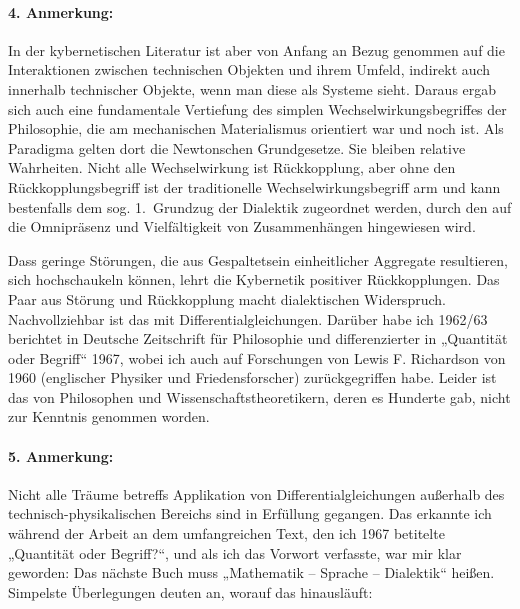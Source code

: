 \documentclass[11pt,a4paper]{article}
\begin{document}
\paragraph{4. Anmerkung:}
In der kybernetischen Literatur ist aber von Anfang an Bezug genommen auf die
Interaktionen zwischen technischen Objekten und ihrem Umfeld, indirekt auch
innerhalb technischer Objekte, wenn man diese als Systeme sieht. Daraus ergab
sich auch eine fundamentale Vertiefung des simplen Wechselwirkungsbegriffes
der Philosophie, die am mechanischen Materialismus orientiert war und noch
ist. Als Paradigma gelten dort die Newtonschen Grundgesetze. Sie bleiben
relative Wahrheiten. Nicht alle Wechselwirkung ist Rückkopplung, aber ohne den
Rückkopplungsbegriff ist der traditionelle Wechselwirkungsbegriff arm und kann
bestenfalls dem sog. 1.~Grundzug der Dialektik zugeordnet werden, durch den
auf die Omnipräsenz und Vielfältigkeit von Zusammenhängen hingewiesen wird.

Dass geringe Störungen, die aus Gespaltetsein einheitlicher Aggregate
resultieren, sich hochschaukeln können, lehrt die Kybernetik positiver
Rückkopplungen. Das Paar aus Störung und Rückkopplung macht dialektischen
Widerspruch. Nachvollziehbar ist das mit Differentialgleichungen. Darüber habe
ich 1962/63 berichtet in Deutsche Zeitschrift für Philosophie und
differenzierter in „Quantität oder Begriff“ 1967, wobei ich auch auf
Forschungen von Lewis F. Richardson von 1960 (englischer Physiker und
Friedensforscher) zurückgegriffen habe. Leider ist das von Philosophen und
Wissenschaftstheoretikern, deren es Hunderte gab, nicht zur Kenntnis genommen
worden.

\paragraph{5. Anmerkung:}
Nicht alle Träume betreffs Applikation von Differentialgleichungen außerhalb
des technisch-physikalischen Bereichs sind in Erfüllung gegangen. Das erkannte
ich während der Arbeit an dem umfangreichen Text, den ich 1967 betitelte
„Quantität oder Begriff?“, und als ich das Vorwort verfasste, war mir klar
geworden: Das nächste Buch muss „Mathematik – Sprache – Dialektik“ heißen.
Simpelste Überlegungen deuten an, worauf das hinausläuft:
\end{document}
